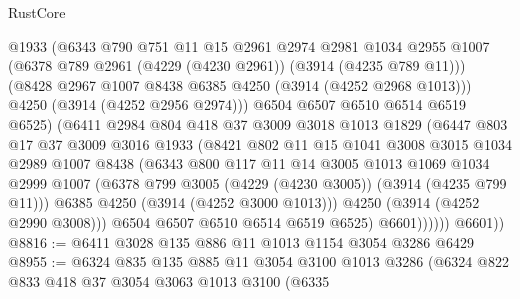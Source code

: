 \begin{lexlean}{RustCore}
\begin{coremodule}
                    @1933
                    (@6343
                      @790
                      @751
                      @11
                      @15
                      @2961
                      @2974
                      @2981
                      @1034
                      @2955
                      @1007
                      (@6378 @789 @2961 (@4229 (@4230 @2961)) (@3914 (@4235 @789 @11)))
                      (@8428 @2967 @1007 @8438 @6385 @4250 (@3914 (@4252 @2968 @1013)))
                      @4250
                      (@3914 (@4252 @2956 @2974)))
                    @6504
                    @6507
                    @6510
                    @6514
                    @6519
                    @6525)
                  (@6411
                    @2984
                    @804
                    @418
                    @37
                    @3009
                    @3018
                    @1013
                    @1829
                    (@6447
                      @803
                      @17
                      @37
                      @3009
                      @3016
                      @1933
                      (@8421
                        @802
                        @11
                        @15
                        @1041
                        @3008
                        @3015
                        @1034
                        @2989
                        @1007
                        @8438
                        (@6343
                          @800
                          @117
                          @11
                          @14
                          @3005
                          @1013
                          @1069
                          @1034
                          @2999
                          @1007
                          (@6378 @799 @3005 (@4229 (@4230 @3005)) (@3914 (@4235 @799 @11)))
                          @6385
                          @4250
                          (@3914 (@4252 @3000 @1013)))
                        @4250
                        (@3914 (@4252 @2990 @3008)))
                      @6504
                      @6507
                      @6510
                      @6514
                      @6519
                      @6525)
                    @6601))))))
        @6601))
@8816 := @6411 @3028 @135 @886 @11 @1013 @1154 @3054 @3286 @6429
@8955 := @6324
    @835
    @135
    @885
    @11
    @3054
    @3100
    @1013
    @3286
    (@6324
      @822
      @833
      @418
      @37
      @3054
      @3063
      @1013
      @3100
      (@6335

\end{coremodule}
\end{lexlean}
